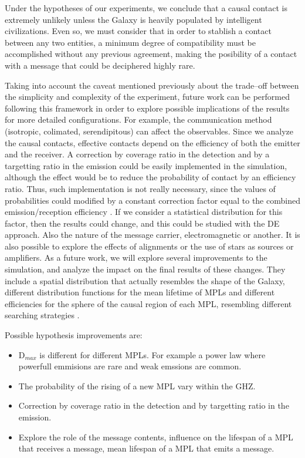 \documentclass[crop]{CSLB}
\begin{document}
Under the hypotheses of our experiments, we conclude that a causal
contact is extremely unlikely unless the Galaxy is heavily populated
by intelligent civilizations.
%
Even so, we must consider that in order to stablish a contact between
any two entities, a minimum degree of compatibility must be
accomplished without any previous agreement, making the posibility of
a contact with a message that could be deciphered highly rare.



Taking into account the caveat mentioned previously about the
trade--off between the simplicity and complexity of the experiment,
future work can be performed following this framework in order to
explore possible implications of the results for more detailed
configurations.
%
For example, the communication method (isotropic, colimated,
serendipitous) can affect the observables.
%
Since we analyze the causal contacts, effective contacts depend on the
efficiency of both the emitter and the receiver.
%
A correction by coverage ratio in the detection and by a targetting
ratio in the emission could be easily implemented in the simulation,
although the effect would be to reduce the probability of contact by
an efficiency ratio.
%
Thus, such implementation is not really necessary, since the values of
probabilities could modified by a constant correction factor equal to
the combined emission/reception efficiency
\citep{smith_broadcasting_2009, anchordoqui_upper_2019,
forgan_collimated_2014}.
%
If we consider a statistical distribution for this factor, then the
results could change, and this could be studied with the DE approach.
%
Also the nature of the message carrier, electromagnetic or another.
%
It is also possible to explore the effects of alignments or the use of
stars as sources or amplifiers.
%
%
As a future work, we will explore several improvements to the
simulation, and analyze the impact on the final results of these
changes.
%
They include a spatial distribution that actually resembles the shape
of the Galaxy, different distribution functions for the mean lifetime
of MPLs and different efficiencies for the sphere of the causal region
of each MPL, resembling different searching strategies
\citep{hippke_interstellar_2017}.


Possible hypothesis improvements are:

\begin{itemize}
   \item D$_{max}$ is different for different MPLs.  For example a power
      law where powerfull emmisions are rare and weak emssions are
      common.
   \item The probability of the rising of a new MPL vary within the GHZ.
   \item Correction by coverage ratio in the detection and by
      targetting ratio in the emission.
   \item Explore the role of the message
      contents, influence on the lifespan of a MPL that receives a
      message, mean lifespan of a MPL that emits a message.
\end{itemize} 
\end{document}
